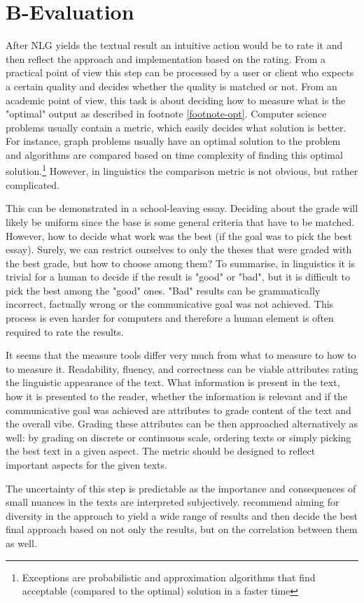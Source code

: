 \section{B-Evaluation}
After NLG yields the textual result an intuitive action would be to rate it and then reflect the approach and implementation based on the rating. From a practical point of view this step can be processed by a user or client who expects a certain quality and decides whether the quality is matched or not. From an academic point of view, this task is about deciding how to measure what is the "optimal" output as described in footnote \ref{footnote-opt}. Computer science problems usually contain a metric, which easily decides what solution is better. For instance, graph problems usually have an optimal solution to the problem and algorithms are compared based on time complexity of finding this optimal solution.\footnote{Exceptions are probabilistic and approximation algorithms that find acceptable (compared to the optimal) solution in a faster time} However, in linguistics the comparison metric is not obvious, but rather complicated.

This can be demonstrated in a school-leaving essay. Deciding about the grade will likely be uniform since the base is some general criteria that have to be matched. However, how to decide what work was the best (if the goal was to pick the best essay). Surely, we can restrict ourselves to only the theses that were graded with the best grade, but how to choose among them? To summarise, in linguistics it is trivial for a human to decide if the result is "good" or "bad", but it is difficult to pick the best among the "good" ones. "Bad" results can be grammatically incorrect, factually wrong or the communicative goal was not achieved. This process is even harder for computers and therefore a human element is often required to rate the results. 

It seems that the measure tools differ very much from what to measure to how to to measure it. Readability, fluency, and correctness can be viable attributes rating the linguistic appearance of the text. What information is present in the text, how it is presented to the reader, whether the information is relevant and if the communicative goal was achieved are attributes to grade content of the text and the overall vibe. Grading these attributes can be then approached alternatively as well: by grading on discrete or continuous scale, ordering texts or simply picking the best text in a given aspect. The metric should be designed to reflect important aspects for the given texts.

The uncertainty of this step is predictable as the importance and consequences of small nuances in the texts are interpreted subjectively. \cite{gatt2018survey} recommend aiming for diversity in the approach to yield a wide range of results and then decide the best final approach based on not only the results, but on the correlation between them as well.

